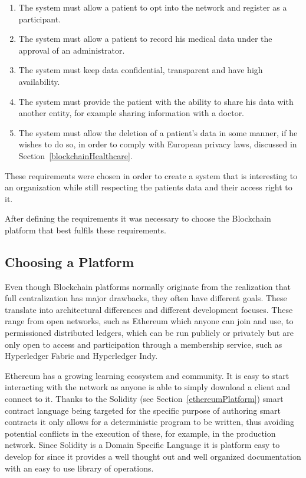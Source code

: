 \renewcommand{\labelenumi}{\Roman{enumi}.}
\begin{enumerate}
  \item The system must allow a patient to opt into the network and register as
    a participant.
  \item The system must allow a patient to record his medical data under the
    approval of an administrator.
  \item The system must keep data confidential, transparent and have
    high availability.
  \item The system must provide the patient with the ability to share his data
    with another entity, for example sharing information with a doctor.
  \item The system must allow the deletion of a patient's data in some manner,
    if he wishes to do so, in order to comply with European privacy laws,
    discussed in Section~\ref{blockchainHealthcare}.
\end{enumerate}

These requirements were chosen in order to create a system that is interesting
to an organization while still respecting the patients data and their access
right to it. 

After defining the requirements it was necessary to choose the Blockchain
platform that best fulfils these requirements.

\subsection{Choosing a Platform}\label{choosePlatform}

Even though Blockchain platforms normally originate from the realization that
full centralization has major drawbacks, they often have different goals. These
translate into architectural differences and different development focuses.
These range from open networks, such as Ethereum which anyone can join and use,
to permissioned distributed ledgers, which can be run publicly or privately but
are only open to access and participation through a membership service, such as
Hyperledger Fabric and Hyperledger Indy.

Ethereum has a growing learning ecosystem and community. It is easy to start
interacting with the network as anyone is able to simply download a client and
connect to it. Thanks to the Solidity (see Section~\ref{ethereumPlatform})
smart contract language being targeted for the specific purpose of authoring
smart contracts it only allows for a deterministic program to be written, thus
avoiding potential conflicts in the execution of these, for example, in the
production network. Since Solidity is a Domain Specific Language it is platform
easy to develop for since it provides a well thought out and well organized
documentation with an easy to use library of operations.


